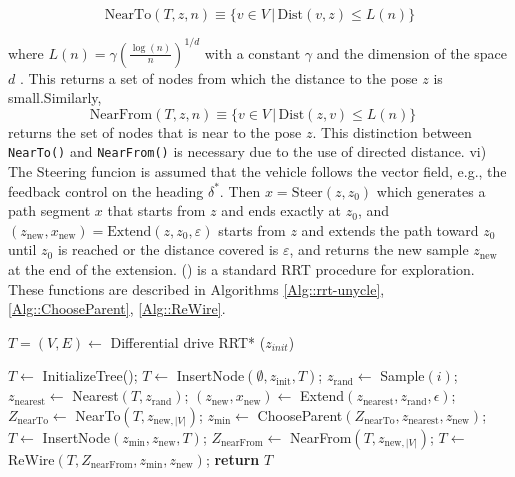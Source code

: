 \documentclass[conference]{IEEEtran}
\begin{document}
\begin{equation}
\label{Eq::nearto}
    \text{NearTo}(T, z, n) \equiv \{v \in V \, | \, \text{Dist}(v, z) \leq L(n)\}
\end{equation}

\noindent where $L(n) = \gamma \left( \frac{\log(n)}{n} \right)^{1/d}$ with a constant $\gamma$ and the dimension of the space $d$ \cite{Fernandez2019}. This returns a set of nodes from which the distance to the pose $z$ is small.Similarly, 
\begin{equation}
\label{Eq::nearfrom}
   \text{NearFrom}(T, z, n) \equiv \{v \in V \,|\, \text{Dist}(z, v) \leq L(n)\} \quad
\end{equation}
returns the set of nodes that is near to the pose $z$. This distinction between \texttt{NearTo()} and \texttt{NearFrom()} is necessary due to the use of directed distance. vi) The Steering funcion is assumed that the vehicle follows the vector field, e.g., the feedback control on the heading $\delta^*$. Then $x = \text{Steer}(z, z_0)$ which generates a path segment $x$ that starts from $z$ and ends exactly at $z_0$, and $(z_{\text{new}}, x_{\text{new}}) = \text{Extend}(z, z_0, \varepsilon)$ starts from $z$ and extends the path toward $z_0$ until $z_0$ is reached or the distance covered is $\varepsilon$, and returns the new sample $z_{\text{new}}$ at the end of the extension. () is a standard RRT procedure for exploration. These functions are described in Algorithms \ref{Alg::rrt-unycle}, \ref{Alg::ChooseParent}, \ref{Alg::ReWire}.


\begin{algorithm}
\caption{ $T =(V,E) \leftarrow$ Differential drive RRT* ($z_{init}$)}
\label{Alg::rrt-unycle}
\begin{algorithmic}[1]
\State $T  \leftarrow$ InitializeTree();
\State $T \leftarrow$ InsertNode$(\emptyset, z_{\text{init}}, T)$;
    \State $z_{\text{rand}} \leftarrow$ Sample$(i)$;
    \State $z_{\text{nearest}} \leftarrow$ Nearest$(T, z_{\text{rand}})$;
    \State $(z_{\text{new}}, x_{\text{new}}) \leftarrow$ Extend$(z_{\text{nearest}}, z_{\text{rand}}, \epsilon)$;
        \State $Z_{\text{nearTo}} \leftarrow$ NearTo$(T, z_{\text{new}, |V|})$;
        \State $z_{\text{min}} \leftarrow$ ChooseParent$(Z_{\text{nearTo}}, z_{\text{nearest}}, z_{\text{new}})$;
        \State $T \leftarrow$ InsertNode$(z_{\text{min}}, z_{\text{new}}, T)$;
        \State $Z_{\text{nearFrom}} \leftarrow$ NearFrom$(T, z_{\text{new}, |V|})$;
        \State $T \leftarrow$ ReWire$(T, Z_{\text{nearFrom}}, z_{\text{min}}, z_{\text{new}})$;
    \EndIf
\EndFor
\State \textbf{return} $T$
\end{algorithmic}
\end{algorithm}
\end{document}
